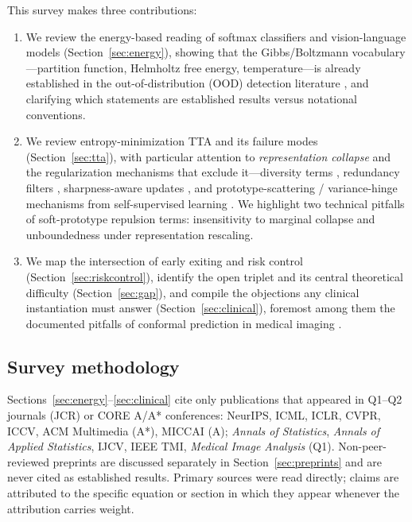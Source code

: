 \documentclass[preprint,12pt]{elsarticle}
\begin{document}
This survey makes three contributions:

\begin{enumerate}
\item We review the energy-based reading of softmax classifiers and vision-language models (Section~\ref{sec:energy}), showing that the Gibbs/Boltzmann vocabulary---partition function, Helmholtz free energy, temperature---is already established in the out-of-distribution (OOD) detection literature \citep{liu2020energy,grathwohl2020jem,ming2022mcm,ming2023cider,yuan2024tea}, and clarifying which statements are established results versus notational conventions.
\item We review entropy-minimization TTA and its failure modes (Section~\ref{sec:tta}), with particular attention to \emph{representation collapse} and the regularization mechanisms that exclude it---diversity terms \citep{liang2020shot}, redundancy filters \citep{niu2022eata}, sharpness-aware updates \citep{niu2023sar}, and prototype-scattering / variance-hinge mechanisms from self-supervised learning \citep{bardes2022vicreg,zbontar2021barlow,caron2020swav,caron2021dino}. We highlight two technical pitfalls of soft-prototype repulsion terms: insensitivity to marginal collapse and unboundedness under representation rescaling.
\item We map the intersection of early exiting and risk control (Section~\ref{sec:riskcontrol}), identify the open triplet and its central theoretical difficulty (Section~\ref{sec:gap}), and compile the objections any clinical instantiation must answer (Section~\ref{sec:clinical}), foremost among them the documented pitfalls of conformal prediction in medical imaging \citep{mehrtens2023pitfalls}.
\end{enumerate}

\subsection{Survey methodology}
\label{sec:method}

Sections~\ref{sec:energy}--\ref{sec:clinical} cite only publications that appeared in Q1--Q2 journals (JCR) or CORE A/A* conferences: NeurIPS, ICML, ICLR, CVPR, ICCV, ACM Multimedia (A*), MICCAI (A); \emph{Annals of Statistics}, \emph{Annals of Applied Statistics}, IJCV, IEEE TMI, \emph{Medical Image Analysis} (Q1). Non-peer-reviewed preprints are discussed separately in Section~\ref{sec:preprints} and are never cited as established results. Primary sources were read directly; claims are attributed to the specific equation or section in which they appear whenever the attribution carries weight.
\end{document}
